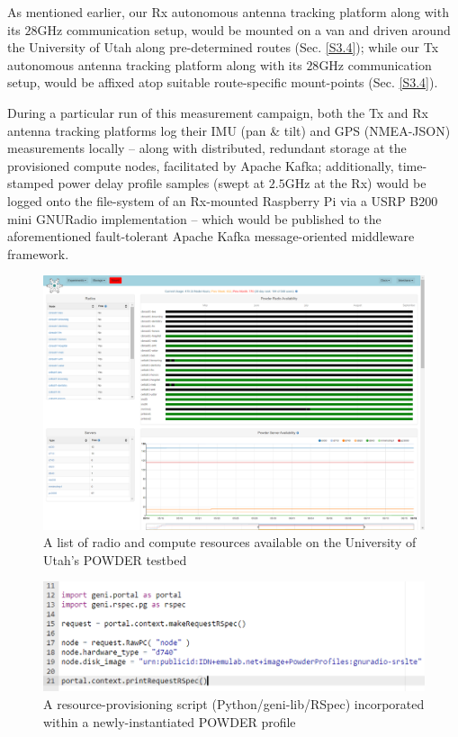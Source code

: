 \documentclass[12pt]{article}
\newcommand{\areaofinterestfigwidth}{1.0\textwidth}
\begin{document}
        \noindent As mentioned earlier, our Rx autonomous antenna tracking platform along with its $28$GHz communication setup, would be mounted on a van and driven around the University of Utah along pre-determined routes (Sec. \ref{S3.4}); while our Tx autonomous antenna tracking platform along with its $28$GHz communication setup, would be affixed atop suitable route-specific mount-points (Sec. \ref{S3.4}).\newline
        
        \noindent During a particular run of this measurement campaign, both the Tx and Rx antenna tracking platforms log their IMU (pan \& tilt) and GPS (NMEA-JSON) measurements locally -- along with distributed, redundant storage at the provisioned compute nodes, facilitated by Apache Kafka; additionally, time-stamped power delay profile samples (swept at $2.5$GHz at the Rx) would be logged onto the file-system of an Rx-mounted Raspberry Pi via a USRP B$200$mini GNURadio implementation -- which would be published to the aforementioned fault-tolerant Apache Kafka message-oriented middleware framework.
        \begin{figure}
            \centering
            \includegraphics[width=\areaofinterestfigwidth]{figs/POWDER_Resource_Availability.png}
            \caption{A list of radio and compute resources available on the University of Utah's POWDER testbed}
            \label{fig:avail}
        \end{figure}
        \begin{figure}
            \centering
            \includegraphics[width=\areaofinterestfigwidth]{figs/Resource_Provisioning.png}
            \caption{A resource-provisioning script (Python/geni-lib/RSpec) incorporated within a newly-instantiated POWDER profile}
            \label{fig:profile}
        \end{figure}
    
\end{document}
